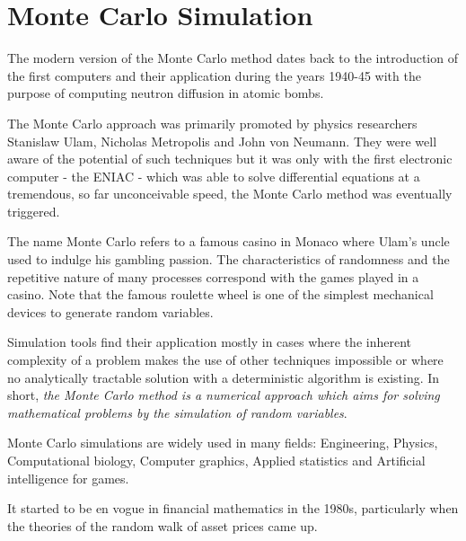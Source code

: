 \chapter{Monte Carlo Simulation}\label{cap:montecarlo}

The modern version of the Monte Carlo method dates back to the
introduction of the first computers and their application during the
years 1940-45 with the purpose of computing neutron diffusion in atomic
bombs.

The Monte Carlo approach was primarily promoted by physics
researchers Stanislaw Ulam, Nicholas Metropolis and John von Neumann.
They were well aware of the potential of such techniques but it was only
with the first electronic computer - the ENIAC - which was able to solve
differential equations at a tremendous, so far unconceivable speed, the
Monte Carlo method was eventually triggered.

The name Monte Carlo refers to a famous casino in Monaco where Ulam's
uncle used to indulge his gambling passion. 
The characteristics of
randomness and the repetitive nature of many processes correspond with
the games played in a casino. Note that the famous roulette wheel is
one of the simplest mechanical devices to generate random variables.

Simulation tools find their application mostly in cases where the
inherent complexity of a problem makes the use of other techniques
impossible or where no analytically tractable solution with a
deterministic algorithm is existing. In short, \emph{the Monte Carlo method is
a numerical approach which aims for solving mathematical problems by the
simulation of random variables}.

Monte Carlo simulations are widely used in many fields: Engineering,
Physics, Computational biology, Computer graphics, Applied statistics and 
Artificial intelligence for games.

It started to be en vogue in financial mathematics in the 1980s,
particularly when the theories of the random walk of asset prices came
up.



